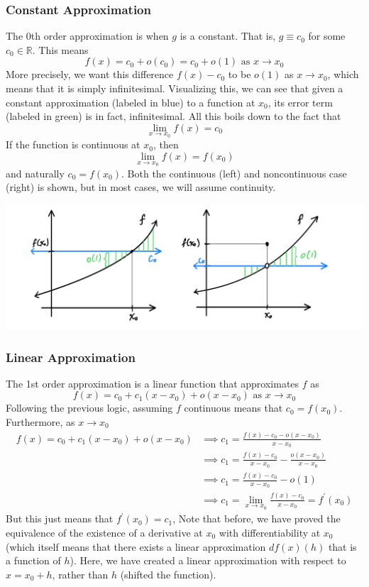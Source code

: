   \subsubsection{Constant Approximation}
  The 0th order approximation is when $g$ is a constant. That is, $g \equiv c_0$ for some $c_0 \in \mathbb{R}$. This means
  \[f(x) = c_0 + o(c_0) = c_0 + o(1) \text{ as } x \rightarrow x_0\]
  More precisely, we want this difference $f(x) - c_0$ to be $o(1)$ as $x \rightarrow x_0$, which means that it is simply infinitesimal. Visualizing this, we can see that given a constant approximation (labeled in blue) to a function at $x_0$, its error term (labeled in green) is in fact, infinitesimal. All this boils down to the fact that 
  \[\lim_{x \rightarrow x_0} f(x) = c_0\]
  If the function is continuous at $x_0$, then 
  \[\lim_{x \rightarrow x_0} f(x) = f(x_0)\]
  and naturally $c_0 = f(x_0)$. Both the continuous (left) and noncontinuous case (right) is shown, but in most cases, we will assume continuity. 
  \begin{center}
      \includegraphics[scale=0.3]{img/Constant_Approximation_Continuous_Noncontinuous_case.PNG}
  \end{center}

  \subsubsection{Linear Approximation}
  The 1st order approximation is a linear function that approximates $f$ as
  \[f(x) = c_0 + c_1(x - x_0) + o(x - x_0) \text{ as } x \rightarrow x_0\]
  Following the previous logic, assuming $f$ continuous means that $c_0 = f(x_0)$. Furthermore, as $x \rightarrow x_0$
  \begin{align*}
      f(x) = c_0 + c_1(x - x_0) + o(x - x_0) & \implies c_1 = \frac{f(x) - c_0 - o(x - x_0)}{x - x_0} \\
      & \implies c_1 = \frac{f(x) - c_0}{x - x_0} - \frac{o(x - x_0)}{x - x_0}\\
      & \implies c_1 = \frac{f(x) - c_0}{x - x_0} - o(1) \\
      & \implies c_1 = \lim_{x \rightarrow x_0} \frac{f(x) - c_0}{x - x_0} = f^\prime (x_0)
  \end{align*}
  But this just means that $f^\prime (x_0) = c_1$, Note that before, we have proved the equivalence of the existence of a derivative at $x_0$ with differentiability at $x_0$ (which itself means that there exists a linear approximation $df(x)(h)$ that is a function of $h$). Here, we have created a linear approximation with respect to $x = x_0 + h$, rather than $h$ (shifted the function). 

